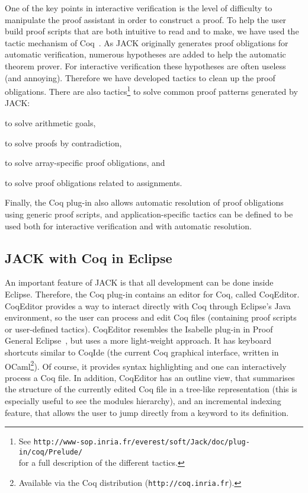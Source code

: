 One of the key points in interactive verification is the level of
difficulty to manipulate the proof assistant in order to construct a
proof.  To help the user build proof scripts that are both intuitive
to read and to make, we have used the tactic mechanism of
Coq~\cite{DEL-00-LTAC}.  As JACK originally generates proof
obligations for automatic verification, numerous hypotheses are added
to help the automatic theorem prover. For interactive verification
these hypotheses are often useless (and annoying). Therefore we have
developed tactics to clean up the proof obligations. There are also
tactics\footnote{See \texttt{http://www-sop.inria.fr/everest/soft/Jack/doc/plug-in/coq/Prelude/}\\
for a full description of the different tactics.}  to solve common
proof patterns generated by JACK:
\begin{inparaenum}
\item to solve arithmetic goals,
\item to solve proofs by contradiction,
\item to solve array-specific proof obligations, and
\item to solve proof obligations related to assignments.
\end{inparaenum}
Finally, the Coq plug-in also allows automatic resolution of proof
obligations using generic proof scripts, and application-specific
tactics can be defined to be used both for interactive verification
and with automatic resolution.



\subsection{JACK with Coq in Eclipse}

An important feature of JACK is that all development can be done
inside Eclipse.  Therefore, the Coq plug-in contains an editor for Coq,
called CoqEditor. CoqEditor provides a way to interact directly with
Coq through Eclipse's Java environment, so the user can process and
edit Coq files (containing proof scripts or user-defined tactics).
CoqEditor resembles the Isabelle plug-in in Proof General
Eclipse~\cite{WintersteinAL05}, but uses a more light-weight approach.
It has keyboard shortcuts similar to CoqIde (the current Coq graphical
interface, written in OCaml\footnote{Available via the Coq
distribution (\texttt{http://coq.inria.fr}).}). Of course, it provides
syntax highlighting and one can interactively process a Coq file.  In
addition, CoqEditor has an outline view, that summarises the structure
of the currently edited Coq file in a tree-like representation (this
is especially useful to see the modules hierarchy), and an incremental
indexing feature, that allows the user to jump directly from a keyword
to its definition.


